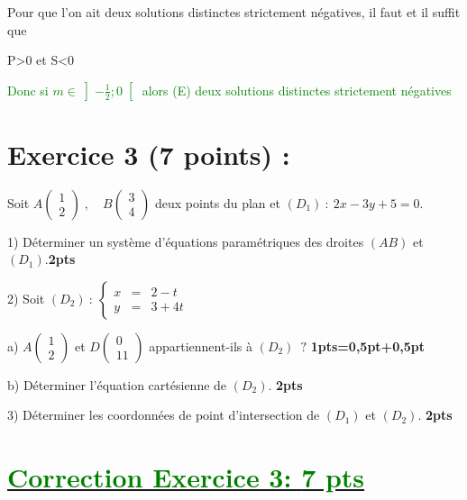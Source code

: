 \documentclass[12pt]{article}
\begin{document}
Pour que l'on ait deux solutions distinctes strictement négatives, il faut et il suffit que

 P>0 et S<0

\textcolor{green}{Donc si $m\in\left]-\frac{1}{2} ; 0\right[ $ alors (E) deux solutions distinctes strictement négatives}

\section*{Exercice 3 (7 points) :}
Soit $A\begin{pmatrix} 1 \\ 2\end{pmatrix}\;,\quad B\begin{pmatrix} 3 \\ 4\end{pmatrix}$ deux points du plan et $(D_{1})\ :\ 2x-3y+5=0.$

1) Déterminer un système d'équations paramétriques des droites $(AB)$ et $(D_{1}).$\textbf{2pts}

2) Soit $(D_{2})\ :\ \left\lbrace\begin{array}{rcl} x&=&2-t \\ y&=&3+4t\end{array}\right.$

a) $A\begin{pmatrix} 1 \\ 2\end{pmatrix}$ et $D\begin{pmatrix} 0 \\ 11\end{pmatrix}$ appartiennent-ils à $(D_{2})\;\ ?$ \textbf{1pts=0,5pt+0,5pt}

b) Déterminer l'équation cartésienne de $(D_{2})$. \textbf{2pts}

3) Déterminer les coordonnées de point d'intersection de $(D_{1})$ et $(D_{2})$. \textbf{2pts}
\section*{\underline{\textcolor{green}{Correction Exercice 3: \textbf{7 pts}}}}
\end{document}
